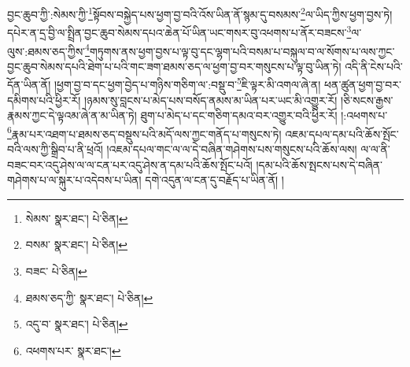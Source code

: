བྱང་ཆུབ་ཀྱི་:སེམས་ཀྱི་\footnote{སེམས་  སྣར་ཐང་།  པེ་ཅིན། }སྟོབས་བསྐྱེད་པས་ཕྱག་བྱ་བའི་འོས་ཡིན་ནོ་སྙམ་དུ་བསམས་\footnote{བསམ་  སྣར་ཐང་།  པེ་ཅིན། }ལ་ཡིད་ཀྱིས་ཕྱག་བྱས་ཏེ། དཔེར་ན་དྲ་བྱི་ལ་སྤྲིན་བྱང་ཆུབ་སེམས་དཔའ་ཆེན་པོ་ཡིན་ཡང་གསར་བུ་འཕགས་པ་ནོར་བཟངས་\footnote{བཟང་  པེ་ཅིན། }ལ་ལུས་:ཐམས་ཅད་ཀྱིས་\footnote{ཐམས་ཅད་ཀྱི་  སྣར་ཐང་།  པེ་ཅིན། }གཏུགས་ནས་ཕྱག་བྱས་པ་ལྟ་བུ་དང་ལྷག་པའི་བསམ་པ་བསྐུལ་བ་ལ་སོགས་པ་ལས་ཀྱང་བྱང་ཆུབ་སེམས་དཔའི་ཐེག་པ་པའི་གང་ཟག་ཐམས་ཅད་ལ་ཕྱག་བྱ་བར་གསུངས་པ་ལྟ་བུ་ཡིན་ཏེ། འདི་ནི་ངེས་པའི་དོན་ཡིན་ནོ། །ཕྱག་བྱ་བ་དང་ཕྱག་བྱེད་པ་གཉིས་གཅིག་ལ་:བསྡུ་བ་\footnote{འདུ་བ་  སྣར་ཐང་།  པེ་ཅིན། }ཇི་ལྟར་མི་འགལ་ཞེ་ན། ཕན་ཚུན་ཕྱག་བྱ་བར་དམིགས་པའི་ཕྱིར་རོ། །ཉམས་སུ་བླངས་པ་མེད་པས་བསོད་ནམས་མ་ཡིན་པར་ཡང་མི་འགྱུར་རོ། །ཅི་སངས་རྒྱས་རྣམས་ཀྱང་དེ་ལྟའམ་ཞེ་ན་མ་ཡིན་ཏེ། ཐུག་པ་མེད་པ་དང་གཅིག་དམའ་བར་འགྱུར་བའི་ཕྱིར་རོ། །:འཕགས་པ་\footnote{འཕགས་པར་  སྣར་ཐང་། }རྣམ་པར་འཐག་པ་ཐམས་ཅད་བསྡུས་པའི་མདོ་ལས་ཀྱང་གནོད་པ་གསུངས་ཏེ། འཇམ་དཔལ་དམ་པའི་ཆོས་སྤོང་བའི་ལས་ཀྱི་སྒྲིབ་པ་ནི་ཕྲའོ། །འཇམ་དཔལ་གང་ལ་ལ་དེ་བཞིན་གཤེགས་པས་གསུངས་པའི་ཆོས་ལས། ལ་ལ་ནི་བཟང་བར་འདུ་ཤེས་ལ་ལ་ངན་པར་འདུ་ཤེས་ན་དམ་པའི་ཆོས་སྤོང་པའོ། །དམ་པའི་ཆོས་སྤངས་པས་དེ་བཞིན་གཤེགས་པ་ལ་སྐུར་པ་འདེབས་པ་ཡིན། དགེ་འདུན་ལ་ངན་དུ་བརྗོད་པ་ཡིན་ནོ། །
